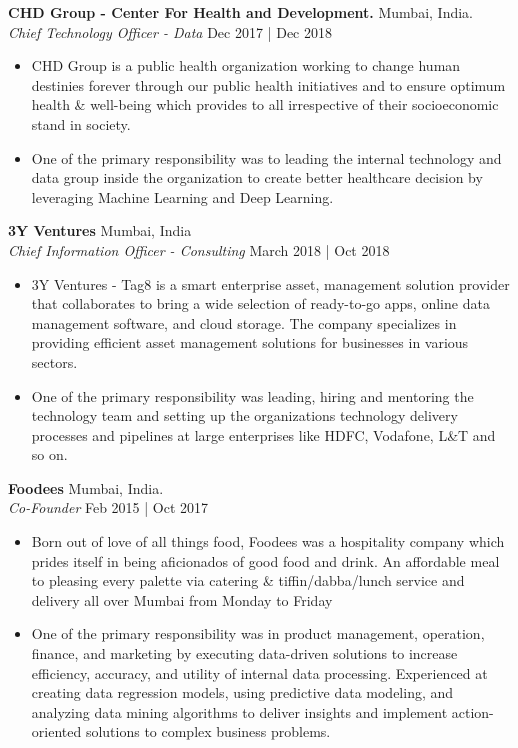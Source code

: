 \documentclass[a4paper]{article}
\begin{document}
\textbf{CHD Group - Center For Health and Development.} \hfill Mumbai, India.\\
\textit{Chief Technology Officer - Data} \hfill Dec 2017 | Dec 2018\\
\vspace{-1mm}
\begin{itemize} \itemsep 1pt
	\item CHD Group is a public health organization working to change human destinies forever through our public health initiatives and to ensure optimum health \& well-being which provides to all irrespective of their socioeconomic stand in society.
	\item One of the primary responsibility was to leading the internal technology and data group inside the organization to create better healthcare decision by leveraging Machine Learning and Deep Learning.
\end{itemize}
\textbf{3Y Ventures} \hfill Mumbai, India\\
\textit{Chief Information Officer - Consulting} \hfill March 2018 | Oct 2018\\
\vspace{-1mm}
\begin{itemize} \itemsep 1pt
	\item 3Y Ventures - Tag8 is a smart enterprise asset, management solution provider that collaborates to bring a wide selection of ready-to-go apps, online data management software, and cloud storage. The company specializes in providing efficient asset management solutions for businesses in various sectors.
	\item One of the primary responsibility was leading, hiring and mentoring the technology team and setting up the organization\textquotesingle{}s technology delivery processes and pipelines at large enterprises like HDFC, Vodafone, L\&T and so on.
\end{itemize}
\textbf{Foodees} \hfill Mumbai, India.\\
\textit{Co-Founder} \hfill Feb 2015 | Oct 2017\\
\vspace{-1mm}
\begin{itemize} \itemsep 1pt
	\item Born out of love of all things food, Foodees was a hospitality company which prides itself in being aficionados of good food and drink. An affordable meal to pleasing every palette via catering \& tiffin/dabba/lunch service and delivery all over Mumbai from Monday to Friday
	\item One of the primary responsibility was in product management, operation, finance, and marketing by executing data-driven solutions to increase efficiency, accuracy, and utility of internal data processing. Experienced at creating data regression models, using predictive data modeling, and analyzing data mining algorithms to deliver insights and implement action-oriented solutions to complex business problems.
\end{itemize}
\end{document}
